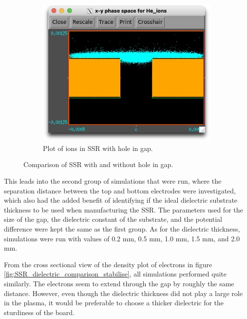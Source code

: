 \begin{figure}
\begin{subfigure}[b]{0.475\textwidth}
    \end{subfigure}
    \hfill
    \begin{subfigure}[b]{0.475\textwidth}   
        \centering 
        \includegraphics[width=\textwidth]{chapter_4/figures/SSR_with_hole_ions.png}
        \caption[]%
        {{\small Plot of ions in SSR with hole in gap.}}    
        \label{fig:SSR_with_hole_ions}
    \end{subfigure}
    \caption[]
    {\small Comparison of SSR with and without hole in gap.} 
    \label{fig:SSR_hole_comparison_stabilise}
\end{figure}

This leads into the second group of simulations that were run, where the separation distance between the top and bottom electrodes were investigated, which also had the added benefit of identifying if the ideal dielectric substrate thickness to be used when manufacturing the SSR. The parameters used for the size of the gap, the dielectric constant of the substrate, and the potential difference were kept the same as the first group. As for the dielectric thickness, simulations were run with values of 0.2 mm, 0.5 mm, 1.0 mm, 1.5 mm, and 2.0 mm. 

From the cross sectional view of the density plot of electrons in figure \ref{fig:SSR_dielectric_comparison_stabilise}, all simulations performed quite similarly. The electrons seem to extend through the gap by roughly the same distance. However, even though the dielectric thickness did not play a large role in the plasma, it would be preferable to choose a thicker dielectric for the sturdiness of the board. 

